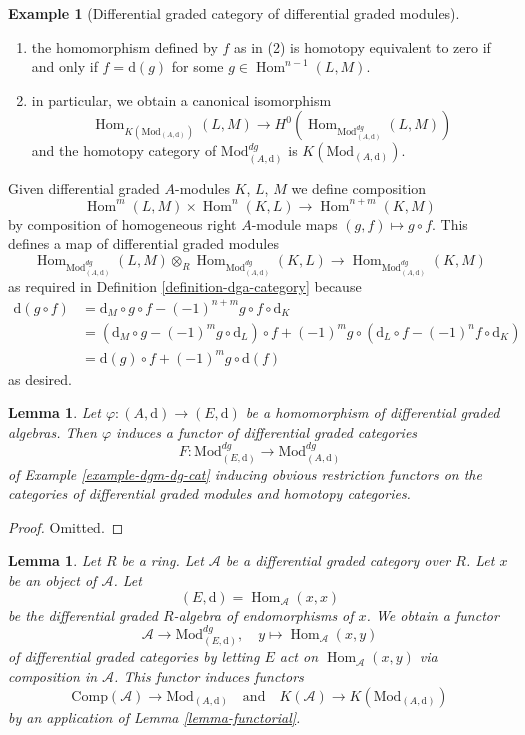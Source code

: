 \documentclass{stacks-project}
\theoremstyle{plain}
\newtheorem{lemma}[subsection]{Lemma}
\theoremstyle{definition}
\newtheorem{example}[subsection]{Example}
\theoremstyle{remark}
\numberwithin{equation}{subsection}
\def\Hom{\mathop{\mathrm{Hom}}\nolimits}
\begin{document}
\begin{example}[Differential graded category of differential graded modules]
\begin{enumerate}
\item the homomorphism defined by $f$ as in (2) is homotopy equivalent
to zero if and only if $f = \text{d}(g)$ for some
$g \in \Hom^{n - 1}(L, M)$.
\item in particular, we obtain a canonical isomorphism
$$
\Hom_{K(\text{Mod}_{(A, \text{d})})}(L, M)
\longrightarrow
H^0(\Hom_{\text{Mod}^{dg}_{(A, \text{d})}}(L, M))
$$
and the homotopy category of $\text{Mod}^{dg}_{(A, \text{d})}$ is
$K(\text{Mod}_{(A, \text{d})})$.
\end{enumerate}
Given differential graded $A$-modules $K$, $L$, $M$ we define
composition
$$
\Hom^m(L, M) \times \Hom^n(K, L) \longrightarrow \Hom^{n + m}(K, M)
$$
by composition of homogeneous right $A$-module maps $(g, f) \mapsto g \circ f$.
This defines a map of differential graded modules
$$
\Hom_{\text{Mod}^{dg}_{(A, \text{d})}}(L, M) \otimes_R
\Hom_{\text{Mod}^{dg}_{(A, \text{d})}}(K, L) \longrightarrow
\Hom_{\text{Mod}^{dg}_{(A, \text{d})}}(K, M)
$$
as required in
Definition \ref{definition-dga-category}
because
\begin{align*}
\text{d}(g \circ f) & =
\text{d}_M \circ g \circ f - (-1)^{n + m} g \circ f \circ \text{d}_K \\
& =
\left(\text{d}_M \circ g - (-1)^m g \circ \text{d}_L\right) \circ f +
(-1)^m g \circ \left(\text{d}_L \circ f - (-1)^n f \circ \text{d}_K\right) \\
& =
\text{d}(g) \circ f + (-1)^m g \circ \text{d}(f)
\end{align*}
as desired.
\end{example}

\begin{lemma}
\label{lemma-homomorphism-induces-dga-functor}
Let $\varphi : (A, \text{d}) \to (E, \text{d})$ be a homomorphism of
differential graded algebras. Then $\varphi$ induces a functor of differential
graded categories
$$
F :
\text{Mod}^{dg}_{(E, \text{d})}
\longrightarrow
\text{Mod}^{dg}_{(A, \text{d})}
$$
of Example \ref{example-dgm-dg-cat} inducing obvious restriction functors
on the categories of differential graded modules and homotopy categories.
\end{lemma}

\begin{proof}
Omitted.
\end{proof}

\begin{lemma}
\label{lemma-construction}
Let $R$ be a ring. Let $\mathcal{A}$ be a differential graded category
over $R$. Let $x$ be an object of $\mathcal{A}$. Let
$$
(E, \text{d}) = \Hom_\mathcal{A}(x, x)
$$
be the differential graded $R$-algebra of endomorphisms of $x$.
We obtain a functor
$$
\mathcal{A} \longrightarrow \text{Mod}^{dg}_{(E, \text{d})},\quad
y \longmapsto \Hom_\mathcal{A}(x, y)
$$
of differential graded categories by letting $E$ act on
$\Hom_\mathcal{A}(x, y)$ via composition in $\mathcal{A}$.
This functor induces functors
$$
\text{Comp}(\mathcal{A}) \to \text{Mod}_{(A, \text{d})}
\quad\text{and}\quad
K(\mathcal{A}) \to K(\text{Mod}_{(A, \text{d})})
$$
by an application of Lemma \ref{lemma-functorial}.
\end{lemma}
\end{document}
